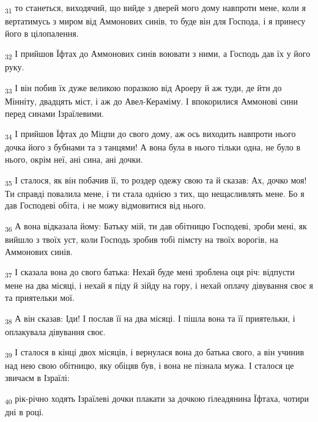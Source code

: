 \begin{tcolorbox}
\textsubscript{31} то станеться, виходячий, що вийде з дверей мого дому навпроти мене, коли я вертатимусь з миром від Аммонових синів, то буде він для Господа, і я принесу його в цілопалення.
\end{tcolorbox}
\begin{tcolorbox}
\textsubscript{32} І прийшов Їфтах до Аммонових синів воювати з ними, а Господь дав їх у його руку.
\end{tcolorbox}
\begin{tcolorbox}
\textsubscript{33} І він побив їх дуже великою поразкою від Ароеру й аж туди, де йти до Мінніту, двадцять міст, і аж до Авел-Кераміму. І впокорилися Аммонові сини перед синами Ізраїлевими.
\end{tcolorbox}
\begin{tcolorbox}
\textsubscript{34} І прийшов Їфтах до Міцпи до свого дому, аж ось виходить навпроти нього дочка його з бубнами та з танцями! А вона була в нього тільки одна, не було в нього, окрім неї, ані сина, ані дочки.
\end{tcolorbox}
\begin{tcolorbox}
\textsubscript{35} І сталося, як він побачив її, то роздер одежу свою та й сказав: Ах, дочко моя! Ти справді повалила мене, і ти стала однією з тих, що нещасливлять мене. Бо я дав Господеві обіта, і не можу відмовитися від нього.
\end{tcolorbox}
\begin{tcolorbox}
\textsubscript{36} А вона відказала йому: Батьку мій, ти дав обітницю Господеві, зроби мені, як вийшло з твоїх уст, коли Господь зробив тобі пімсту на твоїх ворогів, на Аммонових синів.
\end{tcolorbox}
\begin{tcolorbox}
\textsubscript{37} І сказала вона до свого батька: Нехай буде мені зроблена оця річ: відпусти мене на два місяці, і нехай я піду й зійду на гору, і нехай оплачу дівування своє я та приятельки мої.
\end{tcolorbox}
\begin{tcolorbox}
\textsubscript{38} А він сказав: Іди! І послав її на два місяці. І пішла вона та її приятельки, і оплакувала дівування своє.
\end{tcolorbox}
\begin{tcolorbox}
\textsubscript{39} І сталося в кінці двох місяців, і вернулася вона до батька свого, а він учинив над нею свою обітницю, яку обіцяв був, і вона не пізнала мужа. І сталося це звичаєм в Ізраїлі:
\end{tcolorbox}
\begin{tcolorbox}
\textsubscript{40} рік-річно ходять Ізраїлеві дочки плакати за дочкою ґілеадянина Їфтаха, чотири дні в році.
\end{tcolorbox}
